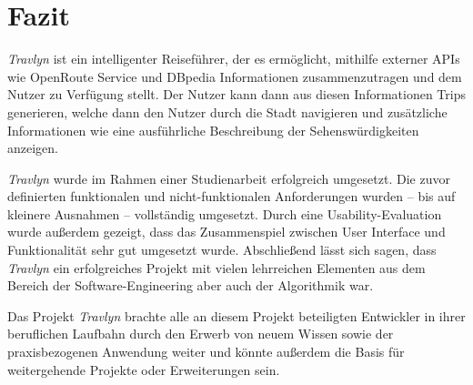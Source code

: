 \chapter{Fazit}

	\textit{Travlyn} ist ein intelligenter Reiseführer, der es ermöglicht, mithilfe externer \acs{API}s wie OpenRoute Service und DBpedia Informationen zusammenzutragen und dem Nutzer zu Verfügung stellt. Der Nutzer kann dann aus diesen Informationen Trips generieren, welche dann den Nutzer durch die Stadt navigieren und zusätzliche Informationen wie eine ausführliche Beschreibung der Sehenswürdigkeiten anzeigen. 
	
	\textit{Travlyn} wurde im Rahmen einer Studienarbeit erfolgreich umgesetzt. Die zuvor definierten funktionalen und nicht-funktionalen Anforderungen wurden -- bis auf kleinere Ausnahmen -- vollständig umgesetzt. Durch eine Usability-Evaluation wurde außerdem gezeigt, dass das Zusammenspiel zwischen User Interface und Funktionalität sehr gut umgesetzt wurde. Abschließend lässt sich sagen, dass \textit{Travlyn} ein erfolgreiches Projekt mit vielen lehrreichen Elementen aus dem Bereich der Software-Engineering aber auch der Algorithmik war. 
	
	Das Projekt \textit{Travlyn} brachte alle an diesem Projekt beteiligten Entwickler in ihrer beruflichen Laufbahn durch den Erwerb von neuem Wissen sowie der praxisbezogenen Anwendung weiter und könnte außerdem die Basis für weitergehende Projekte oder Erweiterungen sein. 
